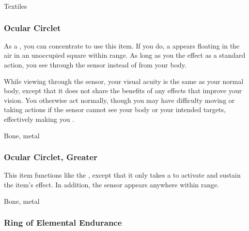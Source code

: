  Textiles


\lowercase{\hypertarget{item:Ocular Circlet}{}}\label{item:Ocular Circlet}
\hypertarget{item:Ocular Circlet}{\subsubsection{Ocular Circlet\hfill{}}}

As a , you can concentrate to use this item.
If you do, a  appears floating in the air in an unoccupied square within \rngclose range.
As long as you  the effect as a standard action, you see through the sensor instead of from your body.

While viewing through the sensor, your visual acuity is the same as your normal body,
except that it does not share the benefits of any  effects that improve your vision.
You otherwise act normally, though you may have difficulty moving or taking actions if the sensor cannot see your body or your intended targets, effectively making you \blinded.



 


 Bone, metal


\lowercase{\hypertarget{item:Ocular Circlet, Greater}{}}\label{item:Ocular Circlet, Greater}
\hypertarget{item:Ocular Circlet, Greater}{\subsubsection{Ocular Circlet, Greater\hfill{}}}

This item functions like the , except that it only takes a  to activate and sustain the item's effect.
In addition, the sensor appears anywhere within \rngmed range.



 


 Bone, metal


\lowercase{\hypertarget{item:Ring of Elemental Endurance}{}}\label{item:Ring of Elemental Endurance}
\hypertarget{item:Ring of Elemental Endurance}{\subsubsection{Ring of Elemental Endurance\hfill{}}}

